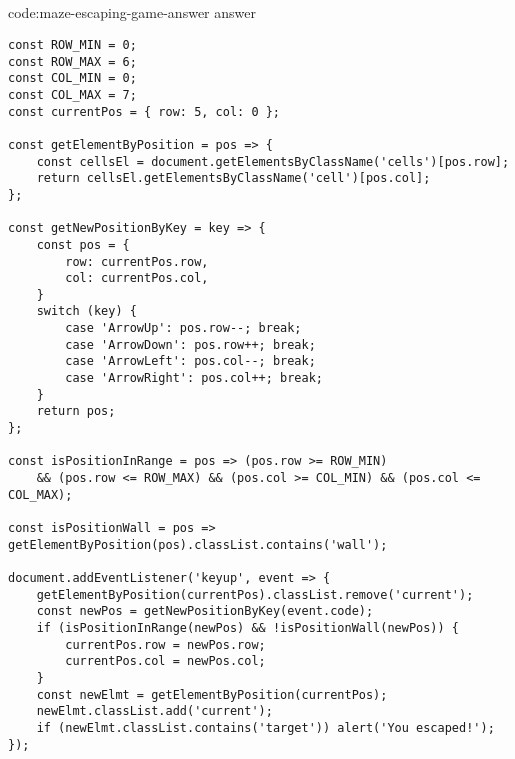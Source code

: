 \subsection*{}

\begin{code}{code:maze-escaping-game-answer}{ answer}
\begin{verbatim}
const ROW_MIN = 0;
const ROW_MAX = 6;
const COL_MIN = 0;
const COL_MAX = 7;
const currentPos = { row: 5, col: 0 };

const getElementByPosition = pos => {
    const cellsEl = document.getElementsByClassName('cells')[pos.row];
    return cellsEl.getElementsByClassName('cell')[pos.col];
};

const getNewPositionByKey = key => {
    const pos = {
        row: currentPos.row,
        col: currentPos.col,
    }
    switch (key) {
        case 'ArrowUp': pos.row--; break;
        case 'ArrowDown': pos.row++; break;
        case 'ArrowLeft': pos.col--; break;
        case 'ArrowRight': pos.col++; break;
    }
    return pos;
};

const isPositionInRange = pos => (pos.row >= ROW_MIN)
    && (pos.row <= ROW_MAX) && (pos.col >= COL_MIN) && (pos.col <= COL_MAX);

const isPositionWall = pos => getElementByPosition(pos).classList.contains('wall');

document.addEventListener('keyup', event => {
    getElementByPosition(currentPos).classList.remove('current');
    const newPos = getNewPositionByKey(event.code);
    if (isPositionInRange(newPos) && !isPositionWall(newPos)) {
        currentPos.row = newPos.row;
        currentPos.col = newPos.col;
    }
    const newElmt = getElementByPosition(currentPos);
    newElmt.classList.add('current');
    if (newElmt.classList.contains('target')) alert('You escaped!');
});
\end{verbatim}
\end{code}
